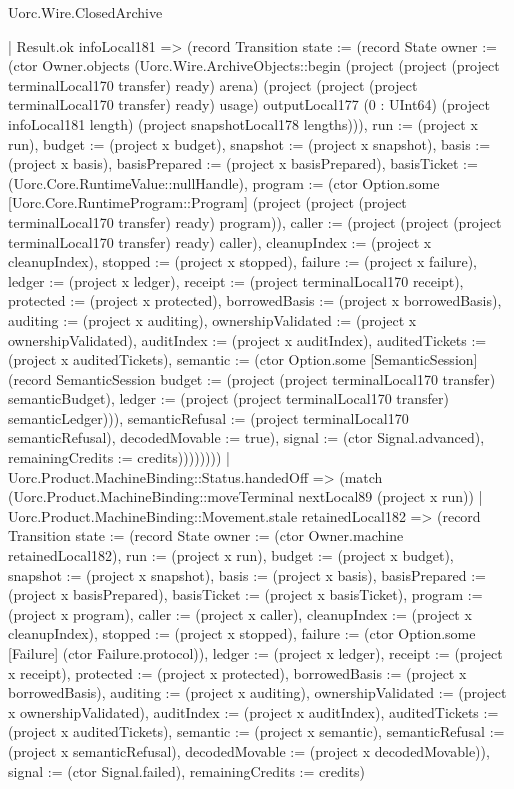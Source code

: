 \begin{lexlean}{Uorc.Wire.ClosedArchive}
\begin{semanticmodule}
{                | Result.ok infoLocal181 => (record Transition {state := (record State {owner := (ctor Owner.objects (Uorc.Wire.ArchiveObjects::begin (project (project (project terminalLocal170 transfer) ready) arena) (project (project (project terminalLocal170 transfer) ready) usage) outputLocal177 (0 : UInt64) (project infoLocal181 length) (project snapshotLocal178 lengths))), run := (project x run), budget := (project x budget), snapshot := (project x snapshot), basis := (project x basis), basisPrepared := (project x basisPrepared), basisTicket := (Uorc.Core.RuntimeValue::nullHandle), program := (ctor Option.some [Uorc.Core.RuntimeProgram::Program] (project (project (project terminalLocal170 transfer) ready) program)), caller := (project (project (project terminalLocal170 transfer) ready) caller), cleanupIndex := (project x cleanupIndex), stopped := (project x stopped), failure := (project x failure), ledger := (project x ledger), receipt := (project terminalLocal170 receipt), protected := (project x protected), borrowedBasis := (project x borrowedBasis), auditing := (project x auditing), ownershipValidated := (project x ownershipValidated), auditIndex := (project x auditIndex), auditedTickets := (project x auditedTickets), semantic := (ctor Option.some [SemanticSession] (record SemanticSession {budget := (project (project terminalLocal170 transfer) semanticBudget), ledger := (project (project terminalLocal170 transfer) semanticLedger)})), semanticRefusal := (project terminalLocal170 semanticRefusal), decodedMovable := true}), signal := (ctor Signal.advanced), remainingCredits := credits}))))))))
    | Uorc.Product.MachineBinding::Status.handedOff => (match (Uorc.Product.MachineBinding::moveTerminal nextLocal89 (project x run))
      | Uorc.Product.MachineBinding::Movement.stale retainedLocal182 => (record Transition {state := (record State {owner := (ctor Owner.machine retainedLocal182), run := (project x run), budget := (project x budget), snapshot := (project x snapshot), basis := (project x basis), basisPrepared := (project x basisPrepared), basisTicket := (project x basisTicket), program := (project x program), caller := (project x caller), cleanupIndex := (project x cleanupIndex), stopped := (project x stopped), failure := (ctor Option.some [Failure] (ctor Failure.protocol)), ledger := (project x ledger), receipt := (project x receipt), protected := (project x protected), borrowedBasis := (project x borrowedBasis), auditing := (project x auditing), ownershipValidated := (project x ownershipValidated), auditIndex := (project x auditIndex), auditedTickets := (project x auditedTickets), semantic := (project x semantic), semanticRefusal := (project x semanticRefusal), decodedMovable := (project x decodedMovable)}), signal := (ctor Signal.failed), remainingCredits := credits})
}
\end{semanticmodule}
\end{lexlean}
